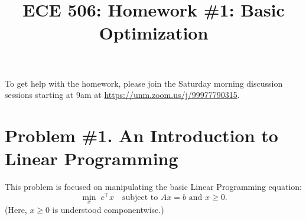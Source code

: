 \documentclass[11pt]{article}
\title{ECE 506: Homework \#1: Basic Optimization}
\date{}
\begin{document}
	\maketitle
	
	\noindent
	To get help with the homework, please join the Saturday morning discussion sessions starting at 9am at
	\url{https://unm.zoom.us/j/99977790315}.
	
	\section*{Problem \#1. An Introduction to Linear Programming}
	
	This problem is focused on manipulating the basic Linear Programming equation:
	\begin{equation}
		\min_{x}\; c^{\top}x
		\quad \text{subject to } Ax = b \text{ and } x \ge 0.
		\label{eq:lp}
	\end{equation}
	(Here, $x \ge 0$ is understood componentwise.)
	
\end{document}

